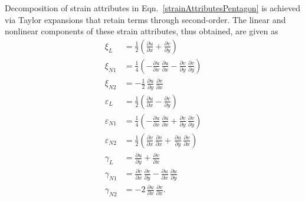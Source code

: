 Decomposition of strain attributes in Eqn.~\eqref{strainAttributesPentagon} is achieved via Taylor expansions that retain terms through second-order.  The linear and nonlinear components of these strain attributes, thus obtained, are given as
\begin{subequations}
    \begin{align}
    \xi_{L} & = \frac{1}{2} \left(\frac{\partial u}{\partial x} + \frac{\partial v}{\partial y} \right) \\
    \xi_{N1} & = \frac{1}{4} \left( -\frac{\partial u}{\partial x} \, \frac{\partial u}{\partial x} - \frac{\partial v}{\partial y} \, \frac{\partial v}{\partial y} \right) \\
    \xi_{N2} & = - \frac{1}{2} \, \frac{\partial u}{\partial y} \, \frac{\partial v}{\partial x} \\
    \varepsilon_{L} & = \frac{1}{2} \left(\frac{\partial u}{\partial x} - \frac{\partial v}{\partial y} \right) \\
    \varepsilon_{N1} & = \frac{1}{4} \left(-\frac{\partial u}{\partial x} \, \frac{\partial u}{\partial x} + \frac{ \partial v}{\partial y} \, \frac{\partial v}{\partial y} \right) \\
    \varepsilon_{N2} & = \frac{1}{2} \left(\frac{\partial v}{\partial x} \, \frac{\partial v}{\partial x} + \, \frac{\partial u}{\partial y} \, \frac{\partial v}{\partial x} \right) \\
    \gamma_{L} & = \frac{\partial u}{\partial y} + \frac{\partial v}{\partial x} \\
    \gamma_{N1} & = \frac{\partial v}{\partial x} \, \frac{\partial v}{\partial y} - \frac{\partial u}{\partial x} \, \frac{\partial u}{\partial y} \\
    \gamma_{N2} & =  - 2 \, \frac{ \partial u}{\partial x} \, \frac{ \partial v}{\partial x} .  
    \end{align}
\end{subequations}
